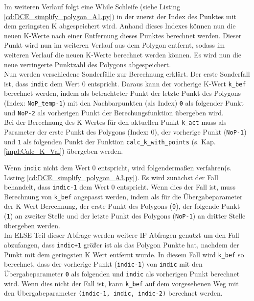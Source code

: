 {	Im weiteren Verlauf folgt eine While Schleife \ifimportant(siehe Listing \ref{cd:DCE_simplify_polygon_A1.py}) \fi in der zuerst der Index des Punktes mit dem geringsten K abgespeichert wird. Anhand dieses Indexes können nun die neuen K-Werte nach einer Entfernung dieses Punktes berechnet werden. Dieser Punkt wird nun im weiteren Verlauf aus dem Polygon entfernt, sodass im weiteren Verlauf die neuen K-Werte berechnet werden können. Es wird nun die neue verringerte Punktzahl des Polygons abgespeichert. \\
	Nun werden verschiedene Sonderfälle zur Berechnung erklärt. Der erste Sonderfall ist, dass \lstinline|indic| dem Wert 0 entspricht. Daraus kann der vorherige K-Wert \lstinline|k_bef| berechnet werden, indem als betrachteter Punkt der letzte Punkt des Polygons (Index: \lstinline|NoP_temp-1|) mit den Nachbarpunkten (als Index) \lstinline|0|  als folgender Punkt und \lstinline|NoP-2| als vorherigen Punkt der Berechungsfunktion übergeben wird. \\
	Bei der Berechnung des K-Wertes für den aktuellen Punkt \lstinline|k_act| muss als Parameter der erste Punkt des Polygons (Index: 0), der vorherige Punkt (\lstinline|NoP-1|) und \lstinline|1| als folgenden Punkt der Funktion \lstinline|calc_k_with_points| (s. Kap. \ref{impl:Calc_K_Val}) übergeben werden. \\

	\ifimportant
	
	\fi

	Wenn \lstinline|indic| nicht dem Wert 0 entspricht, wird folgendermaßen verfahren\ifimportant (s. Listing \ref{cd:DCE_simplify_polygon_A3.py})\fi.
	Es wird zunächst der Fall behandelt, dass \lstinline|indic-1| dem Wert 0 entspricht. Wenn dies der Fall ist, muss Berechnung von \lstinline|k_bef| angepasst werden, indem als für die Übergabeparameter der K-Wert Berechnung, der erste Punkt des Polygons (\lstinline|0|), der folgende Punkt (\lstinline|1|) an zweiter Stelle und der letzte Punkt des Polygons (\lstinline|NoP-1|) an dritter Stelle übergeben werden. \\
	Im ELSE Teil dieser Abfrage werden weitere IF Abfragen genutzt um den Fall abzufangen, dass \lstinline|indic+1| größer ist als das Polygon Punkte hat, nachdem der Punkt mit dem geringsten K Wert entfernt wurde. In diesem Fall wird \lstinline|k_bef| so berechnet, dass der vorherige Punkt (\lstinline|indic-1|) von \lstinline|indic| mit den Übergabeparameter \lstinline|0| als folgenden und \lstinline|indic| als vorherigen Punkt berechnet wird. Wenn dies nicht der Fall ist, kann \lstinline|k_bef| auf dem vorgesehenen Weg mit den Übergabeparameter \lstinline|(indic-1, indic, indic-2)| berechnet werden. \\

}
